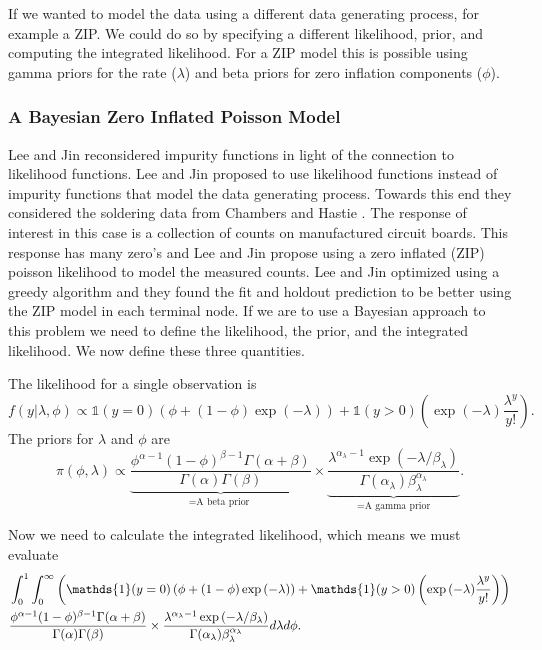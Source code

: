 \documentclass{article}
\begin{document}
If we wanted to model the data using a different data generating process, for example a ZIP. We could do so by specifying a different likelihood, prior, and computing the integrated likelihood. For a ZIP model this is possible using gamma priors for the rate ($\lambda$) and beta priors for zero inflation components ($\phi$). 
 
 \subsubsection{A Bayesian Zero Inflated Poisson Model}
 
 Lee and Jin \cite{lee2006decision} reconsidered impurity functions in light of the connection to likelihood functions. Lee and Jin \cite{lee2006decision} proposed to use likelihood functions instead of impurity functions that model the data generating process. Towards this end they considered the soldering data from Chambers and Hastie \cite{chambers1992statistical}. The response of interest in this case is a collection of counts on manufactured circuit boards. This response has many zero's and Lee and Jin \cite{lee2006decision} propose using a zero inflated (ZIP) poisson likelihood to model the measured counts. Lee and Jin \cite{lee2006decision} optimized using a greedy algorithm and they found the fit and holdout prediction to be better using the ZIP model in each terminal node. If we are to use a Bayesian approach to this problem we need to define the likelihood, the prior, and the integrated likelihood. We now define these three quantities.
 
 The likelihood for a single observation is 
 \begin{equation}
 f(y\vert \lambda, \phi) \propto \mathds{1}(y=0)\left(\phi + (1-\phi)\exp{(-\lambda)}\right) + \mathds{1}(y>0)\left(\exp{(-\lambda)}\frac{\lambda^y}{y!}\right).
 \end{equation}
 The priors for $\lambda$ and $\phi$ are
 \begin{equation}
 \pi(\phi, \lambda)\propto \underbrace{\frac{\phi^{\alpha-1}(1-\phi)^{\beta-1}\Gamma(\alpha+\beta)}{\Gamma(\alpha)\Gamma(\beta)}}_{=\text{A beta prior }} \times \underbrace{\frac{ \lambda^{\alpha_{\lambda}-1}\exp{(-\lambda/\beta_{\lambda})} }{\Gamma(\alpha_{\lambda})\beta_{\lambda}^{\alpha_{\lambda}}}}_{=\text{A gamma prior}}.
 \end{equation}

 Now we need to calculate the integrated likelihood, which means we must evaluate 
 \begin{align} \hspace{-.9in}
 &\int_0^1\int_0^\infty \left(\mathds{1}(y=0)\left(\phi + (1-\phi)\exp{(-\lambda)}\right) + \mathds{1}(y>0)\left(\exp{(-\lambda)}\frac{\lambda^y}{y!}\right)\right) \\ \nonumber
 & \frac{\phi^{\alpha-1}(1-\phi)^{\beta-1}\Gamma(\alpha+\beta)}{\Gamma(\alpha)\Gamma(\beta)} \times \frac{ \lambda^{\alpha_{\lambda}-1}\exp{(-\lambda/\beta_{\lambda})} }{\Gamma(\alpha_{\lambda})\beta_{\lambda}^{\alpha_{\lambda}}}d\lambda d\phi.
 \end{align}
 
\end{document}
